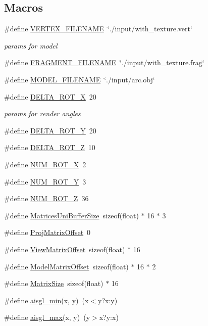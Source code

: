 \subsection*{Macros}
\begin{DoxyCompactItemize}
\item 
\#define \hyperlink{model_8cu_a419f5a78dee2d2497fb46b8efe42876f}{V\-E\-R\-T\-E\-X\-\_\-\-F\-I\-L\-E\-N\-A\-M\-E}~\char`\"{}./input/with\-\_\-texture.\-vert\char`\"{}
\begin{DoxyCompactList}\small\item\em params for model \end{DoxyCompactList}\item 
\#define \hyperlink{model_8cu_a6977f7ba936717590383b04f05cedb3e}{F\-R\-A\-G\-M\-E\-N\-T\-\_\-\-F\-I\-L\-E\-N\-A\-M\-E}~\char`\"{}./input/with\-\_\-texture.\-frag\char`\"{}
\item 
\#define \hyperlink{model_8cu_a66aa9fddb93720ff711114a8a8ea5488}{M\-O\-D\-E\-L\-\_\-\-F\-I\-L\-E\-N\-A\-M\-E}~\char`\"{}./input/arc.\-obj\char`\"{}
\item 
\#define \hyperlink{model_8cu_acc757458b126a47eb4d110b678a00b21}{D\-E\-L\-T\-A\-\_\-\-R\-O\-T\-\_\-\-X}~20
\begin{DoxyCompactList}\small\item\em params for render angles \end{DoxyCompactList}\item 
\#define \hyperlink{model_8cu_a70e0404e32f48ba9400261da630621cb}{D\-E\-L\-T\-A\-\_\-\-R\-O\-T\-\_\-\-Y}~20
\item 
\#define \hyperlink{model_8cu_abdbf601c8a301eea2308c7c22144fac6}{D\-E\-L\-T\-A\-\_\-\-R\-O\-T\-\_\-\-Z}~10
\item 
\#define \hyperlink{model_8cu_a40a0dc5a222fe2b0dd35e6f905207218}{N\-U\-M\-\_\-\-R\-O\-T\-\_\-\-X}~2
\item 
\#define \hyperlink{model_8cu_a427357debdba20990ea70ad96c9abc1f}{N\-U\-M\-\_\-\-R\-O\-T\-\_\-\-Y}~3
\item 
\#define \hyperlink{model_8cu_a58b414f04d228b95891ea4dd40cf9ccc}{N\-U\-M\-\_\-\-R\-O\-T\-\_\-\-Z}~36
\item 
\#define \hyperlink{model_8cu_a69cb816a14c6523874775c0f79226a77}{Matrices\-Uni\-Buffer\-Size}~sizeof(float) $\ast$ 16 $\ast$ 3
\item 
\#define \hyperlink{model_8cu_a8d10f38fead171e48c91cf41b2bdb829}{Proj\-Matrix\-Offset}~0
\item 
\#define \hyperlink{model_8cu_a2eff906dbc2a93745aca1c31a24ec41d}{View\-Matrix\-Offset}~sizeof(float) $\ast$ 16
\item 
\#define \hyperlink{model_8cu_aac8c26813c4941d80716173ee33e6b58}{Model\-Matrix\-Offset}~sizeof(float) $\ast$ 16 $\ast$ 2
\item 
\#define \hyperlink{model_8cu_a4eaa752a2bdb6b534fcc43fb1d73fd49}{Matrix\-Size}~sizeof(float) $\ast$ 16
\item 
\#define \hyperlink{model_8cu_ae19f66e94255e323687e3dcdd5362125}{aisgl\-\_\-min}(x, y)~(x$<$y?x\-:y)
\item 
\#define \hyperlink{model_8cu_a5d7d752ed7ce95f82f595ac2e5e300aa}{aisgl\-\_\-max}(x, y)~(y$>$x?y\-:x)
\end{DoxyCompactItemize}
